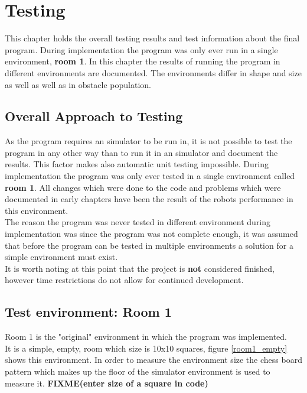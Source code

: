 \chapter{Testing}
\label{Testing}
This chapter holds the overall testing results and test information about the final program. 
During implementation the program was only ever run in a single environment, \textbf{room 1}.
In this chapter the results of running the program in different environments are documented. The environments differ in shape and size as well as well as in obstacle population.

\section{Overall Approach to Testing}
As the program requires an simulator to be run in, it is not possible to test the program in any other way than to run it in an simulator and document the results. This factor makes also automatic unit testing impossible. During implementation the program was only ever tested in a single environment called \textbf{room 1}. All changes which were done to the code and problems which were documented in early chapters have been the result of the robots performance in this environment. \\[3ex]

The reason the program was never tested in different environment during implementation was since the program was not complete enough, it was assumed that before the program can be tested in multiple environments a solution for a simple environment must exist.\\
It is worth noting at this point that the project is \textbf{not} considered finished, however time restrictions do not allow for continued development.  

\section{Test environment: Room 1}
\label{room1}
Room 1 is the "original" environment in which the program was implemented. \\
It is a simple, empty, room which size is 10x10 squares, figure \ref{room1_empty} shows this environment. In order to measure the environment size the chess board pattern which makes up the floor of the simulator environment is used to measure it. \textbf{FIXME(enter size of a square in code)}\\

